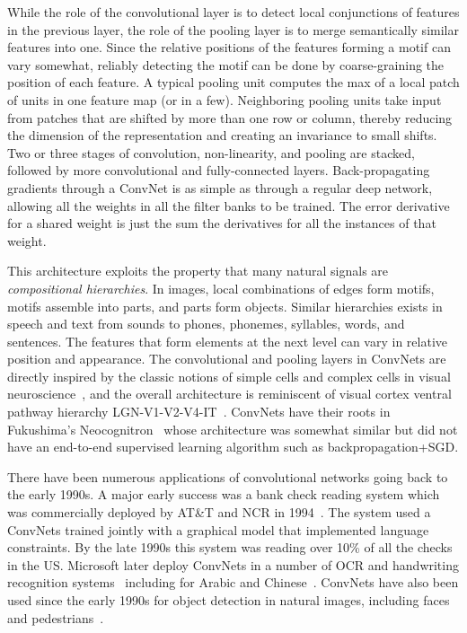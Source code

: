 \documentclass[10pts]{article}
\begin{document}
While the role of the convolutional layer is to detect local
conjunctions of features in the previous layer, the role of the
pooling layer is to merge semantically similar features into
one. Since the relative positions of the features forming a motif can
vary somewhat, reliably detecting the motif can be done by
coarse-graining the position of each feature. A typical pooling unit
computes the max of a local patch of units in one feature map (or in a
few). Neighboring pooling units take input from patches that are
shifted by more than one row or column, thereby reducing the dimension
of the representation and creating an invariance to small shifts.  Two
or three stages of convolution, non-linearity, and pooling are
stacked, followed by more convolutional and fully-connected layers.
Back-propagating gradients through a ConvNet is as simple
as through a regular deep network, allowing all the weights in all the
filter banks to be trained. The error derivative for a shared weight
is just the sum the derivatives for all the instances of that weight.

This architecture exploits the property that many natural signals are
{\em compositional hierarchies}. In images, local combinations of
edges form motifs, motifs assemble into parts, and parts form objects.
Similar hierarchies exists in speech and text from sounds to phones,
phonemes, syllables, words, and sentences. The features that form
elements at the next level can vary in relative position and
appearance. The convolutional and pooling layers in ConvNets are
directly inspired by the classic notions of simple cells and complex
cells in visual neuroscience~\cite{Hubel62}, and the overall
architecture is reminiscent of visual cortex ventral pathway hierarchy
LGN-V1-V2-V4-IT~\citep{Felleman+VanEssen-1991}. ConvNets have their roots in
Fukushima's Neocognitron~\citep{fukushima-82} whose architecture was
somewhat similar but did not have an end-to-end supervised learning
algorithm such as backpropagation+SGD.

There have been numerous applications of convolutional networks going
back to the early 1990s. A major early success
was a bank check
reading system which was commercially deployed by AT\&T and NCR in
1994~\cite{lecun-98}. The system used a ConvNets trained jointly with
a graphical model that implemented language constraints. By the late
1990s this system was reading over 10\% of all the checks in the
US. Microsoft later deploy ConvNets in a number of OCR and handwriting
recognition
systems~\cite{simard-03,chellapilla-ist-06,chellapilla-iwfhr-06b}
including for Arabic and
Chinese~\cite{abdulkader-iwfhr-06,chellapilla-iwfhr-06a}. ConvNets
have also been used since the early 1990s for object detection in
natural images, including faces and
pedestrians~\cite{vaillant-monrocq-lecun-94,garcia-delakis-04,osadchy-07,nasse-09,sermanet-cvpr-13}.
\end{document}
